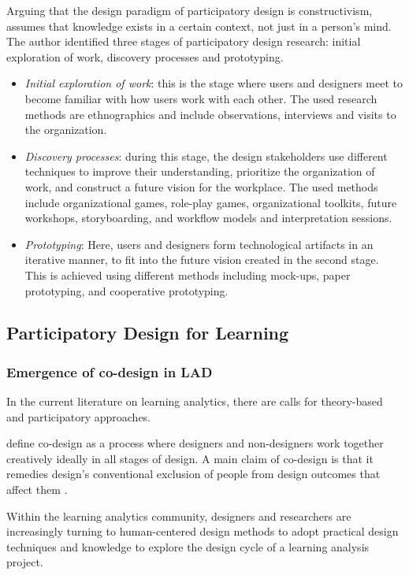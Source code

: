 \documentclass[preprint,12pt]{elsarticle}
\begin{document}
Arguing that the design paradigm of participatory design is constructivism,\citet{spinuzzi2005methodology} assumes that knowledge exists in a certain context, not just in a person's mind. The author identified three stages of participatory design research: initial exploration of work, discovery processes and prototyping. 
\begin{itemize}
    \item \textit{Initial exploration of work}: this is the stage where users and designers meet to become familiar with how users work with each other. The used research methods are ethnographics and include observations, interviews and visits to the organization.
    \item \textit{Discovery processes}: during this stage, the design stakeholders use different techniques to improve their understanding, prioritize the organization of work, and construct a future vision for the workplace. The used methods include organizational games, role-play games, organizational toolkits, future workshops, storyboarding, and workflow models and interpretation sessions.
    \item \textit{Prototyping}: Here, users and designers form technological artifacts in an iterative manner, to fit into the future vision created in the second stage. This is achieved using different methods including mock-ups, paper prototyping, and cooperative prototyping.
\end{itemize}


\subsection{Participatory Design for Learning}
\subsubsection{Emergence of co-design in LAD}
In the current literature on learning analytics, there are calls for theory-based and participatory approaches.

\citet{Sanders2008} define co-design as a process where designers and non-designers work together creatively ideally in all stages of design. A main claim of co-design is that it remedies design’s conventional exclusion of people from design outcomes that affect them \cite{taffe2015hybrid}. 

Within the learning analytics community, designers and researchers are increasingly turning to human-centered design methods to adopt practical design techniques and knowledge to explore the design cycle of a learning analysis project. 
\end{document}
